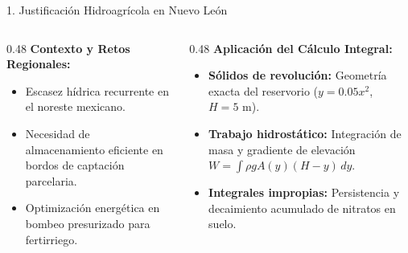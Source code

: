 \documentclass[
  spanish,
  aspectratio=169,
  xcolor={dvipsnames,table}
]{beamer}
\begin{document}
\begin{frame}{1. Justificación Hidroagrícola en Nuevo León}
  \begin{columns}[T]
    \begin{column}{0.48\textwidth}
      \textbf{\color{uanlblue}Contexto y Retos Regionales:}
      \begin{itemize}
        \item Escasez hídrica recurrente en el noreste mexicano.
        \item Necesidad de almacenamiento eficiente en bordos de captación parcelaria.
        \item Optimización energética en bombeo presurizado para fertirriego.
      \end{itemize}
    \end{column}
    \begin{column}{0.48\textwidth}
      \textbf{\color{uanlblue}Aplicación del Cálculo Integral:}
      \begin{itemize}
        \item \textbf{Sólidos de revolución:} Geometría exacta del reservorio ($y = 0.05 x^2$, $H = 5\text{ m}$).
        \item \textbf{Trabajo hidrostático:} Integración de masa y gradiente de elevación $W = \int \rho g A(y)(H-y)\,dy$.
        \item \textbf{Integrales impropias:} Persistencia y decaimiento acumulado de nitratos en suelo.
      \end{itemize}
    \end{column}
  \end{columns}
\end{frame}
\end{document}

